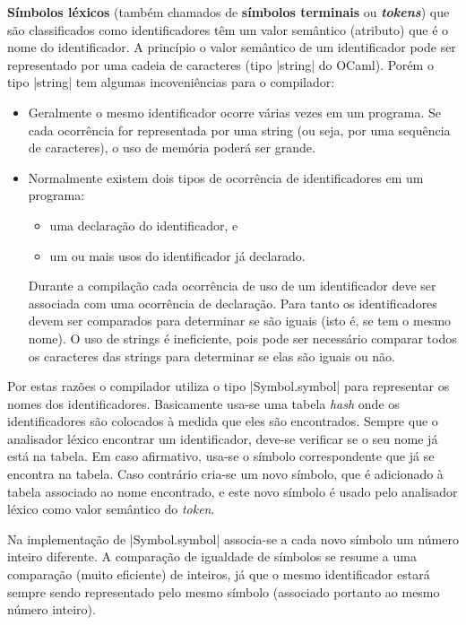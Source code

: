 \documentclass[a4paper,11pt,brazil]{article}
\begin{document}
\textbf{Símbolos léxicos} (também chamados de \textbf{símbolos
  terminais} ou \emph{\textbf{tokens}}) que são classificados como
identificadores têm um valor semântico (atributo) que é o nome do
identificador. A princípio o valor semântico de um identificador pode
ser representado por uma cadeia de caracteres (tipo \pyginline|string|
do OCaml). Porém o tipo \pyginline|string| tem algumas incoveniências
para o compilador:
\begin{itemize}
  \item Geralmente o mesmo identificador ocorre várias vezes em um
  programa. Se cada ocorrência for representada por uma string (ou
  seja, por uma sequência de caracteres), o uso de memória poderá ser
  grande.

  \item Normalmente existem dois tipos de ocorrência de
  identificadores em um programa:
  \begin{itemize}
    \item uma declaração do identificador, e
    \item um ou mais usos do identificador já declarado.
  \end{itemize}
  Durante a compilação cada ocorrência de uso de um identificador deve
  ser associada com uma ocorrência de declaração. Para tanto os
  identificadores devem ser comparados para determinar se são iguais
  (isto é, se tem o mesmo nome). O uso de strings é ineficiente, pois
  pode ser necessário comparar todos os caracteres das strings para
  determinar se elas são iguais ou não.
\end{itemize}

Por estas razões o compilador utiliza o tipo \pyginline|Symbol.symbol|
para representar os nomes dos identificadores. Basicamente usa-se uma
tabela \emph{hash} onde os identificadores são colocados à medida que
eles são encontrados. Sempre que o analisador léxico encontrar um
identificador, deve-se verificar se o seu nome já está na tabela. Em
caso afirmativo, usa-se o símbolo correspondente que já se encontra na
tabela. Caso contrário cria-se um novo símbolo, que é adicionado à
tabela associado ao nome encontrado, e este novo símbolo é usado pelo
analisador léxico como valor semântico do \emph{token}.

Na implementação de \pyginline|Symbol.symbol| associa-se a cada novo
símbolo um número inteiro diferente. A comparação de igualdade de
símbolos se resume a uma comparação (muito eficiente) de inteiros, já
que o mesmo identificador estará sempre sendo representado pelo mesmo
símbolo (associado portanto ao mesmo número inteiro).
\end{document}
